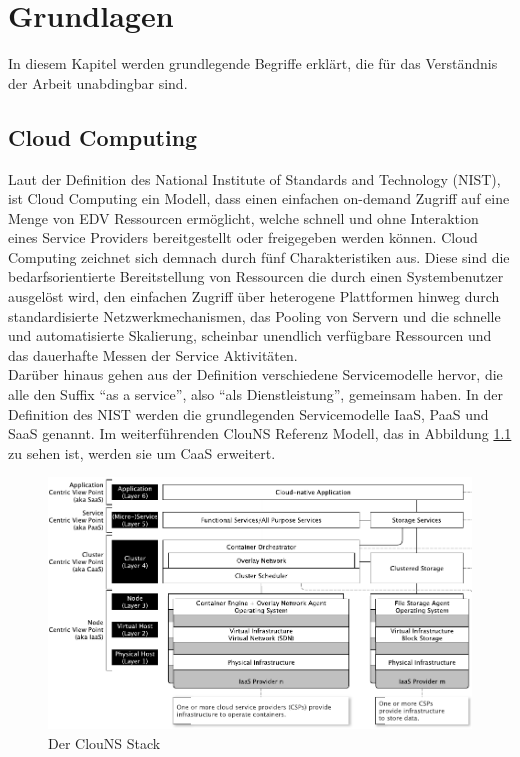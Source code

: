 \chapter{Grundlagen}
In diesem Kapitel werden grundlegende Begriffe erklärt, die für das Verständnis der Arbeit unabdingbar sind.

\section{Cloud Computing}
Laut der Definition des National Institute of Standards and Technology (NIST), ist Cloud Computing ein Modell, dass einen einfachen on-demand Zugriff auf eine Menge von EDV Ressourcen ermöglicht, welche schnell und ohne Interaktion eines Service Providers bereitgestellt oder freigegeben werden können\cite{mell_nist_2011}.
Cloud Computing zeichnet sich demnach durch fünf Charakteristiken aus. Diese sind die bedarfsorientierte Bereitstellung von Ressourcen die durch einen Systembenutzer ausgelöst wird, den einfachen Zugriff über heterogene Plattformen hinweg durch standardisierte Netzwerkmechanismen, das Pooling von Servern und die schnelle und automatisierte Skalierung, scheinbar unendlich verfügbare Ressourcen und das dauerhafte Messen der Service Aktivitäten. \\
Darüber hinaus gehen aus der Definition verschiedene Servicemodelle hervor, die alle den Suffix "`as a service"', also "`als Dienstleistung"', gemeinsam haben. In der Definition des NIST werden die grundlegenden Servicemodelle IaaS, PaaS und SaaS genannt. Im weiterführenden ClouNS Referenz Modell\cite{kratzke_clouns_2016}, das in Abbildung \ref{fig:clouNS} zu sehen ist, werden sie um CaaS erweitert. \\

\begin{figure}[H]
    \includegraphics[width=\textwidth]{img/ClouNS_Stack.png}
    \caption[Der ClouNS Stack]{Der ClouNS Stack\cite{kratzke_clouns_2016}}
    \label{fig:clouNS}
\end{figure}

